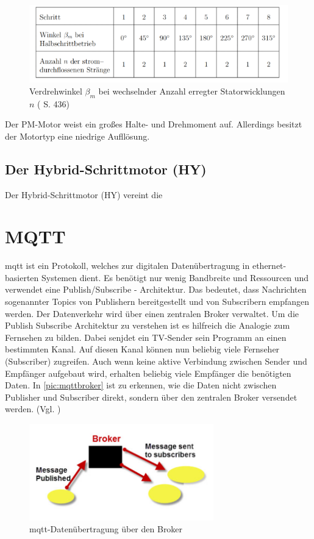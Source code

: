 \begin{figure}[h]
	\begin{center}
		\includegraphics[width=12cm]{halbschrittbetrieb.png}
		\caption{Verdrehwinkel $\beta_m$ bei wechselnder Anzahl erregter Statorwicklungen $n$ (\cite{kleinantriebe} S. 436)}
		\label{pic:halbschrittbetrieb}
	\end{center}
\end{figure}

Der PM-Motor weist ein großes Halte- und Drehmoment auf. Allerdings besitzt der Motortyp eine niedrige Aufllösung. 

\subsection{Der Hybrid-Schrittmotor (HY)}
Der Hybrid-Schrittmotor (HY) vereint die 


\section{MQTT} %
\acrshort{mqtt} ist ein Protokoll, welches zur digitalen Datenübertragung in ethernet-basierten Systemen dient. Es benötigt nur wenig Bandbreite und Ressourcen und verwendet eine 
Publish/Subscribe - Architektur. Das bedeutet, dass Nachrichten sogenannter Topics von Publishern bereitgestellt und von Subscribern empfangen werden. Der Datenverkehr wird über einen 
zentralen Broker verwaltet. Um die Publish Subscribe Architektur zu verstehen ist es hilfreich die Analogie zum Fernsehen zu bilden. Dabei senjdet ein TV-Sender sein Programm an einen bestimmten Kanal.
Auf diesen Kanal können nun beliebig viele Fernseher (Subscriber) zugreifen. Auch wenn keine aktive Verbindung zwischen Sender und Empfänger aufgebaut wird, erhalten beliebig viele Empfänger die benötigten Daten.
In \autoref{pic:mqttbroker} ist zu erkennen, wie die Daten nicht zwischen Publisher und Subscriber direkt, sondern über den zentralen Broker versendet werden. (Vgl. \cite{mqtt})

\begin{figure}[h]
    \begin{center}
        \includegraphics[width=8cm]{mqttbroker.png}
        \caption{\acrshort{mqtt}-Datenübertragung über den Broker}
        \label{pic:mqttbroker}
    \end{center}
\end{figure}